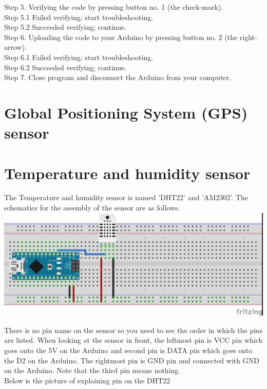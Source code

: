 \documentclass{report}
\begin{document}
Step 5. Verifying the code by pressing button no. 1 (the check-mark). \\
Step 5.1 Failed verifying; start troubleshooting. \\
Step 5.2 Succeeded verifying; continue. \\
Step 6. Uploading the code to your Arduino by pressing button no. 2 (the right-arrow). \\
Step 6.1 Failed verifying; start troubleshooting. \\
Step 6.2 Succeeded verifying; continue. \\
Step 7. Close program and disconnect the Arduino from your computer. \\

\chapter{Global Positioning System (GPS) sensor}

\chapter{Temperature and humidity sensor}
The Temperature and humidity sensor is named 'DHT22' and 'AM2302'. The schematics for the assembly of the sensor are as follows.\\

\includegraphics[scale=0.5]{images/Humi.jpg}

There is no pin name on the sensor so you need to see the order in which the pins are listed. When looking at the sensor in front, the leftmost pin is VCC pin which goes onto the 5V on the Arduino and second pin is DATA pin which goes onto the D2 on the Arduino. The rightmost pin is GND pin and connected with GND on the Arduino. Note that the third pin means nothing. \\
Below is the picture of explaining pin on the DHT22 \\
\end{document}
